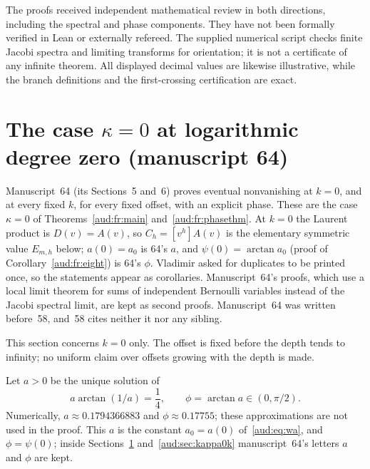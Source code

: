 \documentclass[11pt,a4paper]{article}
\numberwithin{equation}{section}
\begin{document}
The proofs received independent mathematical review in both directions, including the spectral and phase components. They have not been formally verified in Lean or externally refereed. The supplied numerical script checks finite Jacobi spectra and limiting transforms for orientation; it is not a certificate of any infinite theorem. All displayed decimal values are likewise illustrative, while the branch definitions and the first-crossing certification are exact.
\section{The case \texorpdfstring{$\kappa=0$}{kappa=0} at logarithmic degree zero (manuscript 64)}\label{aud:sec:kappa0}
Manuscript~64 (its Sections~5 and~6) proves eventual nonvanishing at $k=0$, and at every fixed $k$, for every fixed offset, with an explicit phase. These are the case $\kappa=0$ of Theorems~\ref{aud:fr:main} and~\ref{aud:fr:phasethm}. At $k=0$ the Laurent product is $D(v)=A(v)$, so $C_h=[v^h]A(v)$ is the elementary symmetric value $E_{m,h}$ below; $a(0)=a_0$ is 64's $a$, and $\psi(0)=\arctan a_0$ (proof of Corollary~\ref{aud:fr:eight}) is 64's $\phi$. Vladimir asked for duplicates to be printed once, so the statements appear as corollaries. Manuscript~64's proofs, which use a local limit theorem for sums of independent Bernoulli variables instead of the Jacobi spectral limit, are kept as second proofs. Manuscript~64 was written before~58, and~58 cites neither it nor any sibling.

This section concerns $k=0$ only. The offset is fixed before the depth tends to infinity; no uniform claim over offsets growing with the depth is made.

Let $a>0$ be the unique solution of
\begin{equation}\label{aud:ap:eq:phase-saddle}
 a\arctan(1/a)=\frac14,
 \qquad \phi=\arctan a\in(0,\pi/2).
\end{equation}
Numerically, $a\approx0.1794366883$ and $\phi\approx0.17755$; these approximations are not used in the proof. This $a$ is the constant $a_0=a(0)$ of~\eqref{aud:eq:wa}, and $\phi=\psi(0)$; inside Sections~\ref{aud:sec:kappa0} and~\ref{aud:sec:kappa0k} manuscript~64's letters $a$ and $\phi$ are kept.
\end{document}

